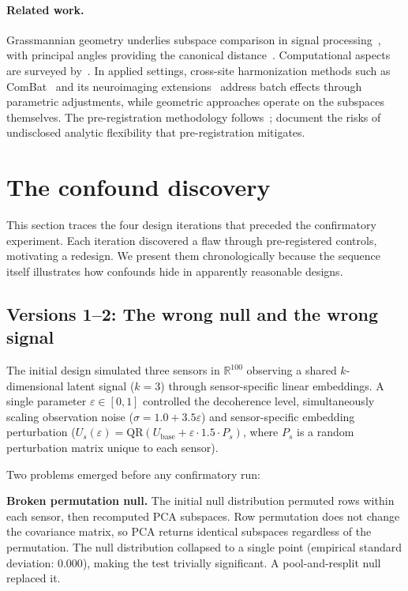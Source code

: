 \documentclass[11pt]{article}
\newcommand{\eps}{\varepsilon}
\begin{document}
\paragraph{Related work.}
Grassmannian geometry underlies subspace comparison in signal
processing~\citep{edelman1998geometry}, with principal angles
providing the canonical distance~\citep{golub1973numerical,
ye2016schubert}.  Computational aspects are surveyed
by~\citet{bendokat2024grassmann}.  In applied settings,
cross-site harmonization methods such as
ComBat~\citep{johnson2007adjusting} and its neuroimaging
extensions~\citep{fortin2018harmonization} address batch effects
through parametric adjustments, while geometric approaches
operate on the subspaces themselves.  The pre-registration
methodology follows~\citet{nosek2018preregistration};
\citet{simmons2011false} document the risks of undisclosed
analytic flexibility that pre-registration mitigates.

\section{The confound discovery}
\label{sec:confound}

This section traces the four design iterations that preceded the
confirmatory experiment.  Each iteration discovered a flaw through
pre-registered controls, motivating a redesign.  We present them
chronologically because the sequence itself illustrates how
confounds hide in apparently reasonable designs.

\subsection{Versions 1--2: The wrong null and the wrong signal}
\label{sec:v1v2}

The initial design simulated three sensors in $\mathbb{R}^{100}$
observing a shared $k$-dimensional latent signal ($k = 3$) through
sensor-specific linear embeddings.  A single parameter $\eps \in
[0, 1]$ controlled the decoherence level, simultaneously
scaling observation noise ($\sigma = 1.0 + 3.5\eps$) and
sensor-specific embedding perturbation ($U_s(\eps) =
\mathrm{QR}(U_\mathrm{base} + \eps \cdot 1.5 \cdot P_s)$, where
$P_s$ is a random perturbation matrix unique to each sensor).

Two problems emerged before any confirmatory run:

\textbf{Broken permutation null.}  The initial null distribution
permuted rows within each sensor, then recomputed PCA subspaces.
Row permutation does not change the covariance matrix, so PCA
returns identical subspaces regardless of the permutation.  The
null distribution collapsed to a single point (empirical standard
deviation: $0.000$), making the test trivially significant.  A
pool-and-resplit null replaced it.
\end{document}
